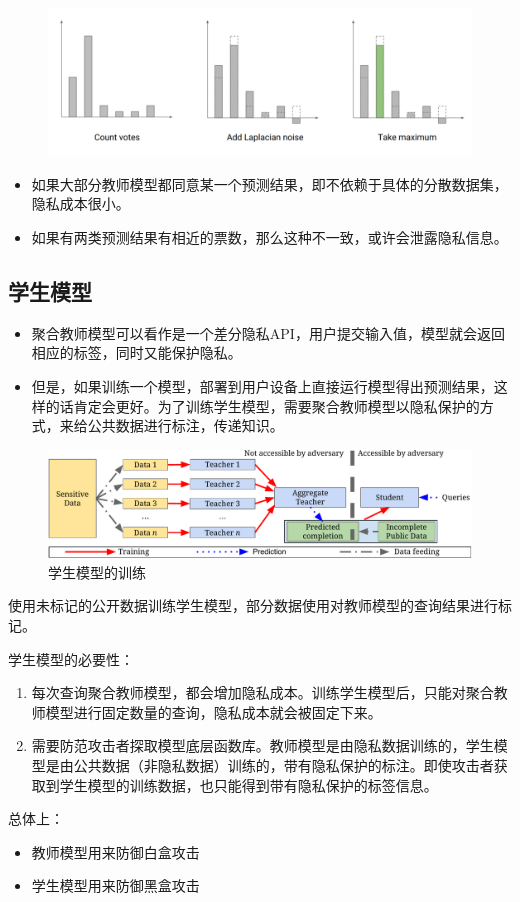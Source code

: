 \documentclass[a4paper]{article}
\begin{document}
\begin{figure}[!ht]
\includegraphics[width = \linewidth]{fig/aggergation.png}
\label{fig:aggergation}
\end{figure}
\begin{itemize}
\item 如果大部分教师模型都同意某一个预测结果，即不依赖于具体的分散数据集，隐私成本很小。
\item 如果有两类预测结果有相近的票数，那么这种不一致，或许会泄露隐私信息。
\end{itemize}


\subsection{学生模型}

\begin{itemize}
\item 聚合教师模型可以看作是一个差分隐私API，用户提交输入值，模型就会返回相应的标签，同时又能保护隐私。
\item 但是，如果训练一个模型，部署到用户设备上直接运行模型得出预测结果，这样的话肯定会更好。为了训练学生模型，需要聚合教师模型以隐私保护的方式，来给公共数据进行标注，传递知识。
\end{itemize}

\begin{figure}[!ht]
\includegraphics[width = \linewidth]{fig/approach-overview.pdf}
\caption{学生模型的训练}
\label{fig:overview}
\end{figure}
使用未标记的公开数据训练学生模型，部分数据使用对教师模型的查询结果进行标记。



学生模型的必要性：
\begin{enumerate}
\item 每次查询聚合教师模型，都会增加隐私成本。训练学生模型后，只能对聚合教师模型进行固定数量的查询，隐私成本就会被固定下来。
\item 需要防范攻击者探取模型底层函数库。教师模型是由隐私数据训练的，学生模型是由公共数据（非隐私数据）训练的，带有隐私保护的标注。即使攻击者获取到学生模型的训练数据，也只能得到带有隐私保护的标签信息。
\end{enumerate}
总体上：
\begin{itemize}
\item 教师模型用来防御白盒攻击
\item 学生模型用来防御黑盒攻击
\end{itemize}
\end{document}
